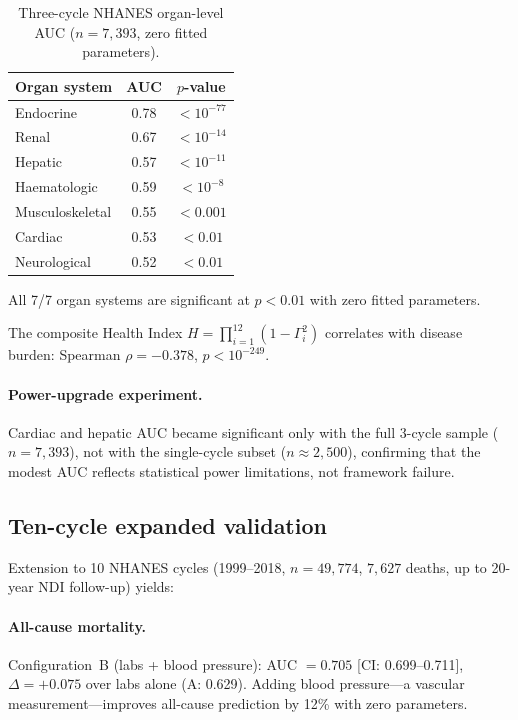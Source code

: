 \documentclass[aps,pre,twocolumn,superscriptaddress,floatfix]{revtex4-2}
\begin{document}
\begin{table}[h]
\centering
\caption{Three-cycle NHANES organ-level AUC
($n = 7{,}393$, zero fitted parameters).}
\label{tab:3cycle}
\begin{tabular}{lcc}
\toprule
Organ system & AUC & $p$-value \\
\midrule
Endocrine    & 0.78 & $< 10^{-77}$ \\
Renal        & 0.67 & $< 10^{-14}$ \\
Hepatic      & 0.57 & $< 10^{-11}$ \\
Haematologic & 0.59 & $< 10^{-8}$ \\
Musculoskeletal & 0.55 & $< 0.001$ \\
Cardiac      & 0.53 & $< 0.01$ \\
Neurological & 0.52 & $< 0.01$ \\
\bottomrule
\end{tabular}
\end{table}

All 7/7 organ systems are significant at $p < 0.01$
with zero fitted parameters.

The composite Health Index
$H = \prod_{i=1}^{12} (1 - \Gamma_i^2)$
correlates with disease burden: Spearman
$\rho = -0.378$, $p < 10^{-249}$.

\paragraph{Power-upgrade experiment.}
Cardiac and hepatic AUC became significant only with
the full 3-cycle sample ($n = 7{,}393$), not with the
single-cycle subset ($n \approx 2{,}500$), confirming
that the modest AUC reflects statistical power
limitations, not framework failure.

\subsection{Ten-cycle expanded validation}
\label{sec:nhanes-10cycle}

Extension to 10 NHANES cycles (1999--2018,
$n = 49{,}774$, $7{,}627$ deaths, up to 20-year
NDI follow-up) yields:

\paragraph{All-cause mortality.}
Configuration~B (labs + blood pressure):
AUC $= 0.705$ [CI: 0.699--0.711],
$\Delta = +0.075$ over labs alone (A: 0.629).
Adding blood pressure---a vascular measurement---improves
all-cause prediction by 12\% with zero parameters.
\end{document}
